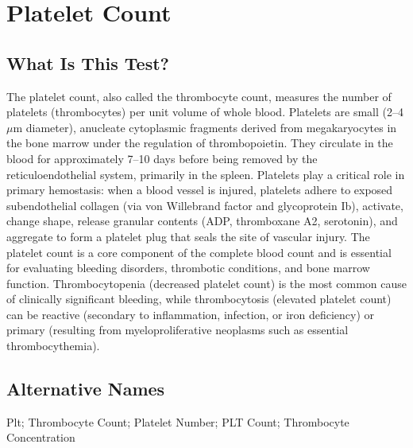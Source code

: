 \chapter{Platelet Count}

\section*{What Is This Test?}
The platelet count, also called the thrombocyte count, measures the number of platelets (thrombocytes) per unit volume of whole blood. Platelets are small (2--4 $\mu$m diameter), anucleate cytoplasmic fragments derived from megakaryocytes in the bone marrow under the regulation of thrombopoietin. They circulate in the blood for approximately 7--10 days before being removed by the reticuloendothelial system, primarily in the spleen. Platelets play a critical role in primary hemostasis: when a blood vessel is injured, platelets adhere to exposed subendothelial collagen (via von Willebrand factor and glycoprotein Ib), activate, change shape, release granular contents (ADP, thromboxane A2, serotonin), and aggregate to form a platelet plug that seals the site of vascular injury. The platelet count is a core component of the complete blood count and is essential for evaluating bleeding disorders, thrombotic conditions, and bone marrow function. Thrombocytopenia (decreased platelet count) is the most common cause of clinically significant bleeding, while thrombocytosis (elevated platelet count) can be reactive (secondary to inflammation, infection, or iron deficiency) or primary (resulting from myeloproliferative neoplasms such as essential thrombocythemia).

\section*{Alternative Names}
Plt; Thrombocyte Count; Platelet Number; PLT Count; Thrombocyte Concentration

